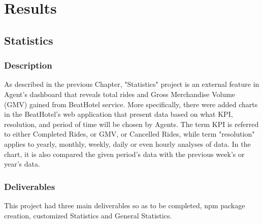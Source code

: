 
\chapter{Results} %

\label{Chapter4}

\section{Statistics}

\subsection{Description}
As described in the previous Chapter, "Statistics" project is an external feature in Agent's dashboard that reveals total rides and Gross Merchandise Volume (GMV) gained from BeatHotel service. More specifically, there were added charts in the BeatHotel's web application that present data based on what KPI, resolution, and period of time will be chosen by Agents. The term KPI is referred to either Completed Rides, or GMV, or Cancelled Rides, while term "resolution" applies to yearly, monthly, weekly, daily or even hourly analyses of data. In the chart, it is also compared the given period's data with the previous week's or year's data. \par

\subsection{Deliverables}
This project had three main deliverables so as to be completed, npm package creation, customized Statistics and General Statistics. \par

